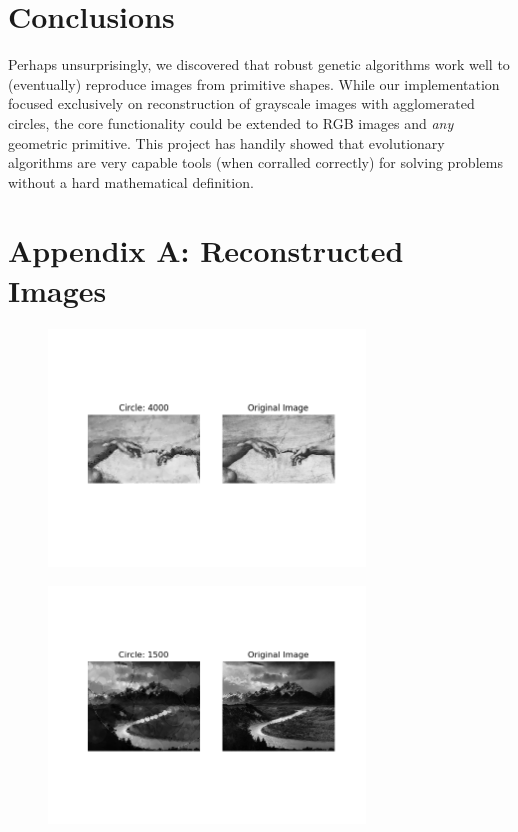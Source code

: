 \documentclass[12pt]{article}
\begin{document}
\section*{Conclusions}
Perhaps unsurprisingly, we discovered that robust genetic algorithms work well to (eventually) reproduce images from primitive shapes. While our implementation focused exclusively on reconstruction of grayscale images with agglomerated circles, the core functionality could be extended to RGB images and \textit{any} geometric primitive. This project has handily showed that evolutionary algorithms are very capable tools (when corralled correctly) for solving problems without a hard mathematical definition. 




\newpage
\section*{Appendix A: Reconstructed Images}
\begin{figure}[H]
\centering
\noindent\includegraphics[width=0.75\textwidth]{../results/adam/adam_4000}
\end{figure}
\begin{figure}[H]
\centering
\noindent\includegraphics[width=0.75\textwidth]{../results/ansel/tetons_1500}
\end{figure}
\end{document}
